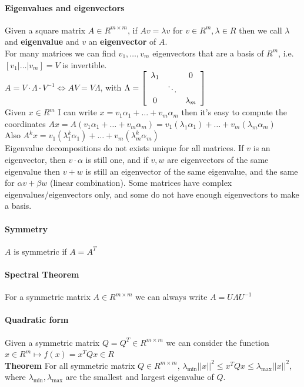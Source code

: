 \documentclass[10pt]{report}
\begin{document}
\paragraph{Eigenvalues and eigenvectors} Given a square matrix $A\in R^{m\times m}$, if $Av = \lambda v$ for $v\in R^m, \lambda\in R$ then we call $\lambda$ and \textbf{eigenvalue} and $v$ an \textbf{eigenvector} of $A$.\\
For many matrices we can find $v_1,\ldots,v_m$ eigenvectors that are a basis of $R^m$, i.e. $[v_1|\ldots|v_m] = V$ is invertible.\\
$A = V\cdot\Lambda\cdot V^{-1}\Leftrightarrow AV = V\Lambda$, with $\Lambda = \left[\begin{array}{c c c}
\lambda_1 & & 0\\
& \ddots \\
0& & \lambda_m
\end{array}\right]$\\
Given $x\in R^m$ I can write $x = v_1\alpha_1 + \ldots + v_m\alpha_m$ then it's easy to compute the coordinates $Ax = A(v_1\alpha_1 + \ldots + v_m\alpha_m) = v_1(\lambda_1\alpha_1) + \ldots + v_m(\lambda_m\alpha_m)$\\
Also $A^kx = v_1(\lambda_1^k\alpha_1) + \ldots + v_m(\lambda_m^k\alpha_m)$\\
Eigenvalue decompositions do not exists unique for all matrices. If $v$ is an eigenvector, then $v\cdot\alpha$ is still one, and if $v,w$ are eigenvectors of the same eigenvalue then $v+w$ is still an eigenvector of the same eigenvalue, and the same for $\alpha v+\beta w$ (linear combination). Some matrices have complex eigenvalues/eigenvectors only, and some do not have enough eigenvectors to make a basis.
\paragraph{Symmetry} $A$ is symmetric if $A = A^T$
\paragraph{Spectral Theorem} For a symmetric matrix $A\in R^{m\times m}$ we can always write $A = U\Lambda U^{-1}$
\paragraph{Quadratic form} Given a symmetric matrix $Q = Q^T \in R^{m\times m}$ we can consider the function $x\in R^m\mapsto f(x) = x^T Qx \in R$\\
\textbf{Theorem} For all symmetric matrix $Q \in R^{m\times m}$, $\lambda_{\min}||x||^2 \leq x^TQx\leq \lambda_{\max}||x||^2$, where $\lambda_{\min}, \lambda_{\max}$ are the smallest and largest eigenvalue of $Q$.
\end{document}
